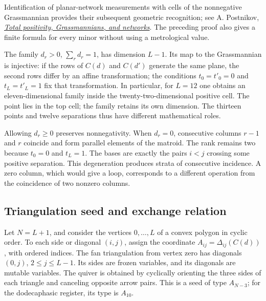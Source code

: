 Identification of planar-network measurements with cells of the
nonnegative Grassmannian provides their subsequent geometric recognition;
see A. Postnikov,
\href{https://arxiv.org/abs/math/0609764}{\emph{Total positivity,
Grassmannians, and networks}}. The preceding proof also gives a finite
formula for every minor without using a metrological value.

The family \(d_r>0\), \(\sum_rd_r=1\), has dimension \(L-1\).
Its map to the Grassmannian is injective: if the rows of \(C(d)\)
and \(C(d')\) generate the same plane, the second rows differ by an
affine transformation; the conditions \(t_0=t'_0=0\) and
\(t_L=t'_L=1\) fix that transformation. In particular, for \(L=12\)
one obtains an eleven-dimensional family inside the twenty-two-dimensional
positive cell. The point lies in the top cell; the family retains its
own dimension. The thirteen points and twelve separations thus have
different mathematical roles.

Allowing \(d_r\ge0\) preserves nonnegativity. When \(d_r=0\),
consecutive columns \(r-1\) and \(r\) coincide and form parallel
elements of the matroid. The rank remains two because \(t_0=0\)
and \(t_L=1\). The bases are exactly the pairs \(i<j\) crossing
some positive separation. This degeneration produces strata of
consecutive incidence. A zero column, which would give a loop,
corresponds to a different operation from the coincidence of two
nonzero columns.

\subsection{Triangulation seed and exchange relation}

Let \(N=L+1\), and consider the vertices \(0,\ldots,L\) of a
convex polygon in cyclic order. To each side or diagonal \((i,j)\),
assign the coordinate \(A_{ij}=\Delta_{ij}(C(d))\), with ordered
indices. The fan triangulation from vertex zero has diagonals
\((0,j)\), \(2\le j\le L-1\). Its sides are frozen variables,
and its diagonals are mutable variables. The quiver is obtained by
cyclically orienting the three sides of each triangle and canceling
opposite arrow pairs. This is a seed of type \(A_{N-3}\); for the
dodecaphasic register, its type is \(A_{10}\).

